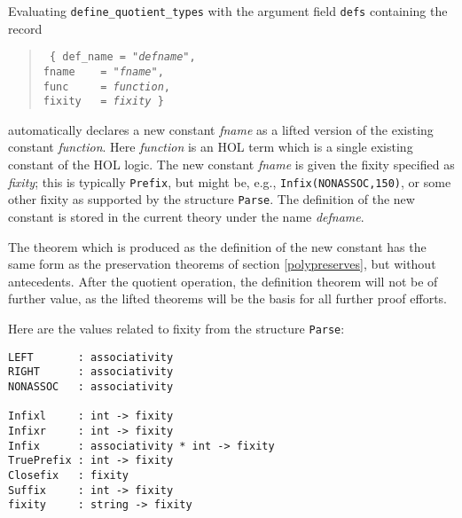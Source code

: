 \documentclass[envcountsame,runningheads]{llncs}
\begin{document}
Evaluating {\tt define\_quotient\_types} with the
argument
field {\tt defs}
containing the record
\begin{verse} \tt
\hspace{\parindent}
\hspace{2.0cm}
\{
def\_name = "{\it defname}", \\
\hspace{2.0cm}
fname \ \ \ = "{\it fname}", \\
\hspace{2.0cm}
func \ \ \ \ = {\it function}, \\
\hspace{2.0cm}
fixity \ \ = {\it fixity} \} \\
\end{verse}

\noindent
automatically declares a new constant {\it fname}
as a lifted version of the existing constant {\it function}.
Here {\it function} is an HOL term which is a single existing constant
of the HOL logic.
The new constant {\it fname} is given the fixity specified as {\it fixity};
this is typically {\tt Prefix}, but might be, e.g.,
{\tt Infix(NONASSOC,150)},
or some other fixity
as supported by the structure {\tt Parse}.
The definition of the new constant is stored in the current theory
under the name {\it defname}.

The theorem which is produced as the definition of the new constant
has the same form as the preservation theorems of section \ref{polypreserves},
but without antecedents.
After the quotient operation,
the definition theorem will not be of further value, as
the lifted theorems will be the basis for all further proof efforts.

Here are the values related to fixity from the structure {\tt Parse}:
\begin{verbatim}
LEFT       : associativity
RIGHT      : associativity
NONASSOC   : associativity

Infixl     : int -> fixity
Infixr     : int -> fixity
Infix      : associativity * int -> fixity
TruePrefix : int -> fixity
Closefix   : fixity
Suffix     : int -> fixity
fixity     : string -> fixity
\end{verbatim}
\end{document}
